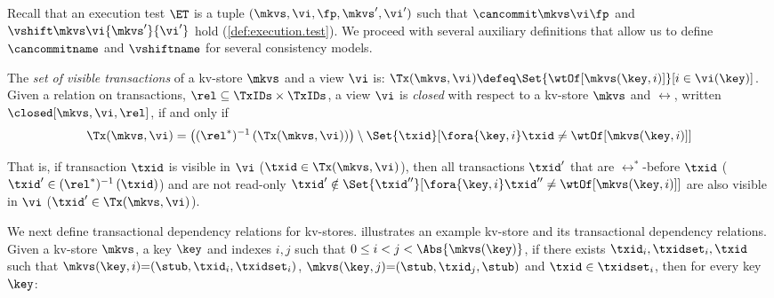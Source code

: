 Recall that an execution test \(\ET\) is a tuple \((\mkvs,\vi, \fp, \allowbreak \mkvs', \vi')\) such that 
\(\cancommit \mkvs \vi \fp\) and \(\vshift \mkvs \vi {\mkvs'} {\vi'}\) hold (\cref{def:execution.test}).
We proceed with several auxiliary definitions that allow us to define \(\cancommitname\) and \(\vshiftname\) for several consistency models. 



The {\em set of visible transactions} of a kv-store \(\mkvs\) and a view \(\vi\) is:
\( \Tx(\mkvs, \vi)  \defeq \Set{\wtOf[\mkvs(\key, i)] }[ i \in \vi(\key)] \).
Given a relation on transactions, \(\rel \subseteq \TxIDs \times \TxIDs\),
a view \(\vi\) is \emph{closed} with respect to a kv-store \(\mkvs\)
and \(\rel\), written \(\closed[\mkvs,\vi,\rel]\),  if and only if 
\[
	\Tx(\mkvs, \vi) = 
	\left( (\rel^*)^{-1} \left( \Tx(\mkvs, \vi) \right) \right) \setminus \Set{\txid }[ \fora{\key,i} \txid \neq \wtOf[\mkvs(\key,i)] ]
\]


That is, if transaction \(\txid\) is visible in \(\vi\) (\( \txid \in \Tx(\mkvs, \vi) \)),
then all transactions \( \txid'  \) that are \(\rel^*\)-before \(\txid\) (\(\txid' \in (\rel^*)^{-1} \left( \txid \right)\))
and are not read-only \( \txid' \notin \Set{\txid'' }[ \fora{\key,i} \txid'' \neq \wtOf[\mkvs(\key,i)] ] \)
are also visible in \(\vi\) (\( \txid' \in \Tx(\mkvs, \vi) \)).

We next define transactional dependency relations for kv-stores.
 illustrates an example kv-store and
its transactional dependency relations.
Given a kv-store \(\mkvs\), a key \(\key\) and 
indexes \(i,j\) such that  \(0 \leq i < j < \Abs{ \mkvs(\key) }\), 
if there exists \(\txid_i, \txidset_i, \txid\) such that 
\(\mkvs(\key, i)  {=} (\stub, \txid_{i}, \txidset_{i})\), \(\mkvs(\key,j) {=} (\stub, \txid_{j}, \stub)\)
and \(\txid \in \txidset_{i}\), 
then for every key \( \key \):

